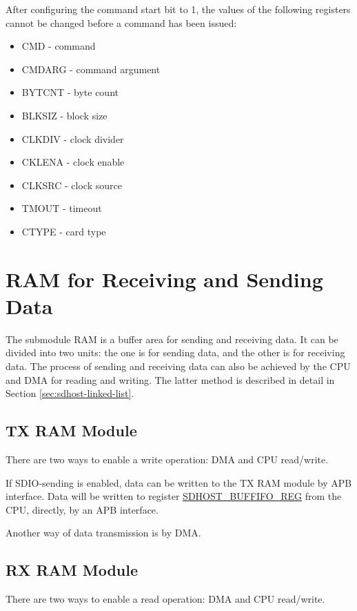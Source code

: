 \documentclass[main\_\_EN.tex]{subfiles}
\begin{document}
After configuring the command start bit to 1, the values of the following registers cannot be changed before a command has been issued:

\begin{itemize}
	\item CMD - command
	\item CMDARG -  command argument
	\item BYTCNT -  byte count
	\item BLKSIZ -  block size
	\item CLKDIV -  clock divider
	\item CKLENA -  clock enable
	\item CLKSRC -  clock source
	\item TMOUT -   timeout
	\item CTYPE -   card type
\end{itemize}

\section{RAM for Receiving and Sending Data}

The submodule RAM is a buffer area for sending and receiving data. It can be divided into two units: the one is for sending data, and the other is for receiving data. The process of sending and receiving data can also be achieved by the CPU and DMA for reading and writing. The latter method is described in detail in Section \ref{sec:sdhost-linked-list}.

\subsection{TX RAM Module}

There are two ways to enable a write operation: DMA and CPU read/write.

If SDIO-sending is enabled, data can be written to the TX RAM module by APB interface. Data will be written to register \hyperref[regdesc:BUFFIFOREG]{SDHOST\_BUFFIFO\_REG} from the CPU, directly, by an APB interface.

Another way of data transmission is by DMA.

\subsection{RX RAM Module}

There are two ways to enable a read operation: DMA and CPU read/write.
\end{document}
